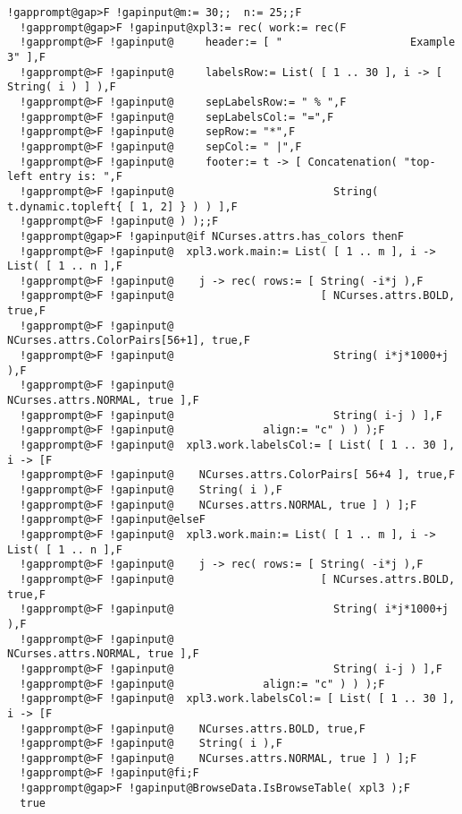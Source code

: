 \documentclass[a4paper,11pt]{report}
\begin{document}
{{{ 
\begin{Verbatim}[commandchars=!@F,fontsize=\small,frame=single,label=Example]
  !gapprompt@gap>F !gapinput@m:= 30;;  n:= 25;;F
  !gapprompt@gap>F !gapinput@xpl3:= rec( work:= rec(F
  !gapprompt@>F !gapinput@     header:= [ "                    Example 3" ],F
  !gapprompt@>F !gapinput@     labelsRow:= List( [ 1 .. 30 ], i -> [ String( i ) ] ),F
  !gapprompt@>F !gapinput@     sepLabelsRow:= " % ",F
  !gapprompt@>F !gapinput@     sepLabelsCol:= "=",F
  !gapprompt@>F !gapinput@     sepRow:= "*",F
  !gapprompt@>F !gapinput@     sepCol:= " |",F
  !gapprompt@>F !gapinput@     footer:= t -> [ Concatenation( "top-left entry is: ",F
  !gapprompt@>F !gapinput@                         String( t.dynamic.topleft{ [ 1, 2] } ) ) ],F
  !gapprompt@>F !gapinput@ ) );;F
  !gapprompt@gap>F !gapinput@if NCurses.attrs.has_colors thenF
  !gapprompt@>F !gapinput@  xpl3.work.main:= List( [ 1 .. m ], i -> List( [ 1 .. n ],F
  !gapprompt@>F !gapinput@    j -> rec( rows:= [ String( -i*j ),F
  !gapprompt@>F !gapinput@                       [ NCurses.attrs.BOLD, true,F
  !gapprompt@>F !gapinput@                         NCurses.attrs.ColorPairs[56+1], true,F
  !gapprompt@>F !gapinput@                         String( i*j*1000+j ),F
  !gapprompt@>F !gapinput@                         NCurses.attrs.NORMAL, true ],F
  !gapprompt@>F !gapinput@                         String( i-j ) ],F
  !gapprompt@>F !gapinput@              align:= "c" ) ) );F
  !gapprompt@>F !gapinput@  xpl3.work.labelsCol:= [ List( [ 1 .. 30 ], i -> [F
  !gapprompt@>F !gapinput@    NCurses.attrs.ColorPairs[ 56+4 ], true,F
  !gapprompt@>F !gapinput@    String( i ),F
  !gapprompt@>F !gapinput@    NCurses.attrs.NORMAL, true ] ) ];F
  !gapprompt@>F !gapinput@elseF
  !gapprompt@>F !gapinput@  xpl3.work.main:= List( [ 1 .. m ], i -> List( [ 1 .. n ],F
  !gapprompt@>F !gapinput@    j -> rec( rows:= [ String( -i*j ),F
  !gapprompt@>F !gapinput@                       [ NCurses.attrs.BOLD, true,F
  !gapprompt@>F !gapinput@                         String( i*j*1000+j ),F
  !gapprompt@>F !gapinput@                         NCurses.attrs.NORMAL, true ],F
  !gapprompt@>F !gapinput@                         String( i-j ) ],F
  !gapprompt@>F !gapinput@              align:= "c" ) ) );F
  !gapprompt@>F !gapinput@  xpl3.work.labelsCol:= [ List( [ 1 .. 30 ], i -> [F
  !gapprompt@>F !gapinput@    NCurses.attrs.BOLD, true,F
  !gapprompt@>F !gapinput@    String( i ),F
  !gapprompt@>F !gapinput@    NCurses.attrs.NORMAL, true ] ) ];F
  !gapprompt@>F !gapinput@fi;F
  !gapprompt@gap>F !gapinput@BrowseData.IsBrowseTable( xpl3 );F
  true
\end{Verbatim}
 

}}}
\end{document}
